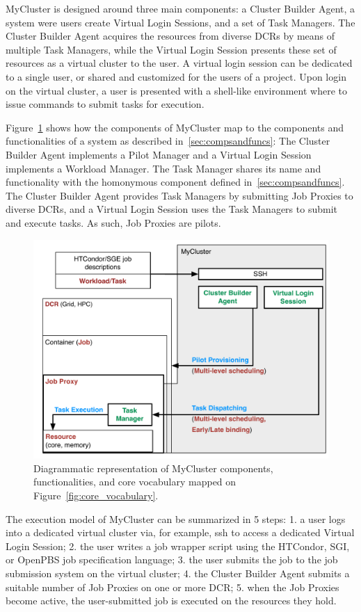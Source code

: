 \documentclass{sig-alternate}
\begin{document}
MyCluster is designed around three main components: a Cluster Builder Agent, a
system were users create Virtual Login Sessions, and a set of Task Managers. The
Cluster Builder Agent acquires the resources from diverse DCRs by means of
multiple Task Managers, while the Virtual Login Session presents these set of
resources as a virtual cluster to the user. A virtual login session can be
dedicated to a single user, or shared and customized for the users of a project.
Upon login on the virtual cluster, a user is presented with a shell-like
environment where to issue commands to submit tasks for execution.

Figure~\ref{fig:mycluster_comparison} shows how the components of MyCluster map
to the components and functionalities of a \pilot system as described
in~\ref{sec:compsandfuncs}: The Cluster Builder Agent implements a Pilot Manager
and a Virtual Login Session implements a Workload Manager. The Task Manager
shares its name and functionality with the homonymous component defined
in~\ref{sec:compsandfuncs}. The Cluster Builder Agent provides Task Managers by
submitting Job Proxies to diverse DCRs, and a Virtual Login Session uses the
Task Managers to submit and execute tasks. As such, Job Proxies are pilots.

\begin{figure}[t]
    \centering
        \includegraphics[width=.48\textwidth]{figures/mycluster_comparison.pdf}
    \caption{Diagrammatic representation of MyCluster components,
    functionalities, and core vocabulary mapped on
    Figure~\ref{fig:core_vocabulary}.}
    \label{fig:mycluster_comparison}
\end{figure}

The execution model of MyCluster can be summarized in 5 steps: 1. a user logs
into a dedicated virtual cluster via, for example, ssh to access a dedicated
Virtual Login Session; 2. the user writes a job wrapper script using the
HTCondor, SGI, or OpenPBS job specification language; 3. the user submits the
job to the job submission system on the virtual cluster; 4. the Cluster Builder
Agent submits a suitable number of Job Proxies on one or more DCR; 5. when the
Job Proxies become active, the user-submitted job is executed on the resources
they hold.
\end{document}
